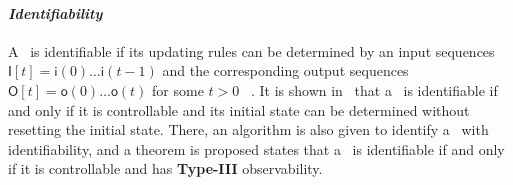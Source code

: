 
\paragraph*{\em Identifiability} A \BCN\  is identifiable if its  updating rules can be determined by an input sequences $\mathsf{I}[t]=\mathsf{i}(0)\ldots\mathsf{i}(t-1)$ and the corresponding output sequences $\mathsf{O}[t]=\mathsf{o}(0)\ldots\mathsf{o}(t)$ for some $t>0$~ \cite{Cheng2011Identification}. It is shown in~\cite{Cheng2011Identification} that a \BCN\  is identifiable if and only if it is controllable and  its initial state can be determined without resetting the initial state. There, an algorithm is also given  to identify a  \BCN\  with identifiability, and a theorem is proposed states that a  \BCN\ is identifiable if and only if it is controllable and has {\bf Type-III} observability.
  

